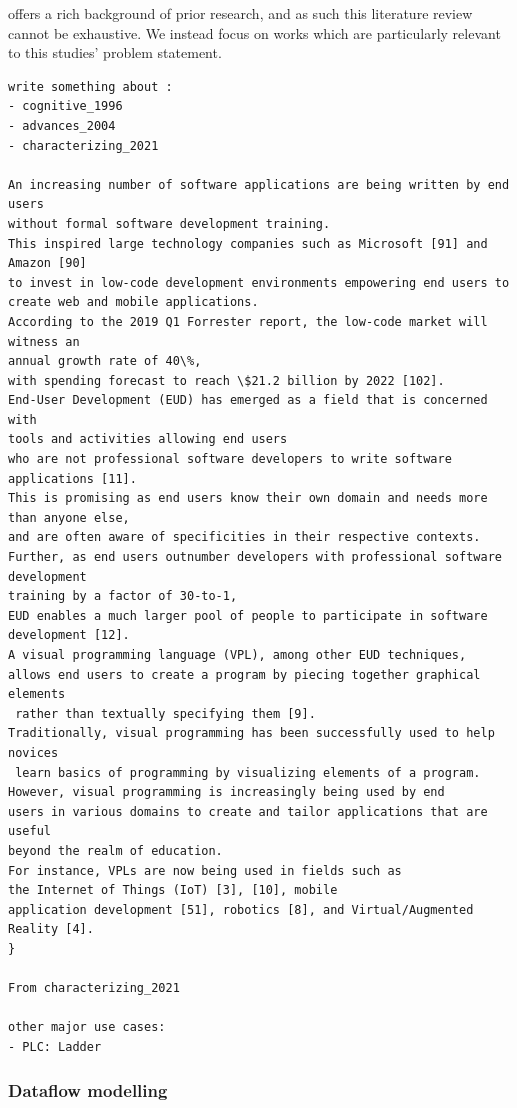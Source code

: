 offers a rich background of prior research, and as such this literature review cannot be exhaustive. 
We instead focus on works which are particularly relevant to this studies' problem statement.

\begin{lstlisting} 
write something about : 
- cognitive_1996 
- advances_2004
- characterizing_2021

An increasing number of software applications are being written by end users 
without formal software development training. 
This inspired large technology companies such as Microsoft [91] and Amazon [90] 
to invest in low-code development environments empowering end users to 
create web and mobile applications. 
According to the 2019 Q1 Forrester report, the low-code market will witness an 
annual growth rate of 40\%, 
with spending forecast to reach \$21.2 billion by 2022 [102]. 
End-User Development (EUD) has emerged as a field that is concerned with 
tools and activities allowing end users 
who are not professional software developers to write software applications [11]. 
This is promising as end users know their own domain and needs more than anyone else, 
and are often aware of specificities in their respective contexts. 
Further, as end users outnumber developers with professional software development 
training by a factor of 30-to-1, 
EUD enables a much larger pool of people to participate in software development [12]. 
A visual programming language (VPL), among other EUD techniques, 
allows end users to create a program by piecing together graphical elements
 rather than textually specifying them [9]. 
Traditionally, visual programming has been successfully used to help novices
 learn basics of programming by visualizing elements of a program. 
However, visual programming is increasingly being used by end 
users in various domains to create and tailor applications that are useful 
beyond the realm of education. 
For instance, VPLs are now being used in fields such as 
the Internet of Things (IoT) [3], [10], mobile 
application development [51], robotics [8], and Virtual/Augmented Reality [4].
}

From characterizing_2021

other major use cases: 
- PLC: Ladder

\end{lstlisting}

\subsubsection*{Dataflow modelling}

